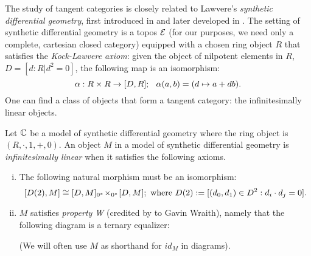 The study of tangent categories is closely related to Lawvere's \emph{synthetic differential geometry}, first introduced in \cite{Lawvere1979} and later developed in \cite{Kock2006, Lavendhomme1996, Moerdijk1991}. The setting of synthetic differential geometry is a topos $\mathcal{E}$ (for our purposes, we need only a complete, cartesian closed category) equipped with a chosen ring object $R$ that satisfies the \emph{Kock-Lawvere axiom}: given the object of nilpotent elements in $R$, $D = [d : R | d^2 = 0]$, the following map is an isomorphism:
\[
    \alpha: R \times R \to [D,R]; \hspace{0.25cm} \alpha(a,b) = (d \mapsto a + db).  
\]
One can find a class of objects that form a tangent category: the infinitesimally linear objects.
\begin{definition}%
\label{def:inf-linear}
    Let $\mathbb{C}$ be a model of synthetic differential geometry where the ring object is $(R, \cdot, 1,+, 0)$.
    An object $M$ in a model of synthetic differential geometry is \emph{infinitesimally linear} when it satisfies the following axioms.
    \begin{enumerate}[(i)]
        \item The following natural morphism must be an isomorphism: 
            \[
                [D(2),M] \cong [D,M]{_{0^*}}\!\times_{0^*}\! [D,M];
                \text{ where } 
                D(2) := [(d_0,d_1) \in D^2 : d_i\cdot d_j = 0].
            \]
        \item $M$ satisfies \emph{property W} (credited by  \cite{Kock2006} to Gavin Wraith), namely that the following diagram is a ternary equalizer:
            
        (We will often use $M$ as shorthand for $id_M$ in diagrams).
    \end{enumerate}
\end{definition}

